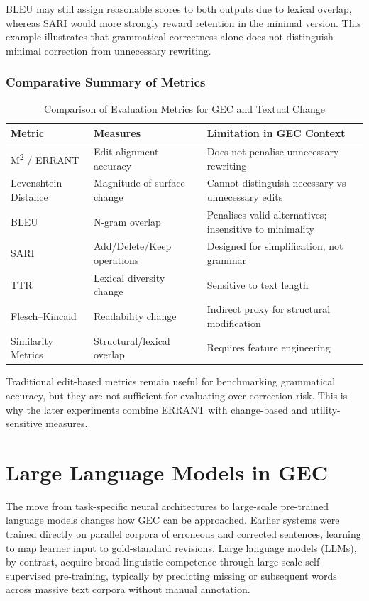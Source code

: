 BLEU may still assign reasonable scores to both outputs due to lexical overlap, whereas SARI would more strongly reward retention in the minimal version. This example illustrates that grammatical correctness alone does not distinguish minimal correction from unnecessary rewriting.

\subsubsection{Comparative Summary of Metrics}

\begin{table}[h]
\centering
\caption{Comparison of Evaluation Metrics for GEC and Textual Change}
\label{tab:metric_comparison}
\begin{tabular}{|p{3cm}|p{4cm}|p{4cm}|}
\hline
\textbf{Metric} & \textbf{Measures} & \textbf{Limitation in GEC Context} \\
\hline
M\textsuperscript{2} / ERRANT & Edit alignment accuracy & Does not penalise unnecessary rewriting \\
\hline
Levenshtein Distance & Magnitude of surface change & Cannot distinguish necessary vs unnecessary edits \\
\hline
BLEU & N-gram overlap & Penalises valid alternatives; insensitive to minimality \\
\hline
SARI & Add/Delete/Keep operations & Designed for simplification, not grammar \\
\hline
TTR & Lexical diversity change & Sensitive to text length \\
\hline
Flesch--Kincaid & Readability change & Indirect proxy for structural modification \\
\hline
Similarity Metrics & Structural/lexical overlap & Requires feature engineering \\
\hline
\end{tabular}
\end{table}

Traditional edit-based metrics remain useful for benchmarking grammatical accuracy, but they are not sufficient for evaluating over-correction risk. This is why the later experiments combine ERRANT with change-based and utility-sensitive measures.

\section{Large Language Models in GEC}

The move from task-specific neural architectures to large-scale pre-trained language models changes how GEC can be approached. Earlier systems were trained directly on parallel corpora of erroneous and corrected sentences, learning to map learner input to gold-standard revisions. Large language models (LLMs), by contrast, acquire broad linguistic competence through large-scale self-supervised pre-training, typically by predicting missing or subsequent words across massive text corpora without manual annotation.

